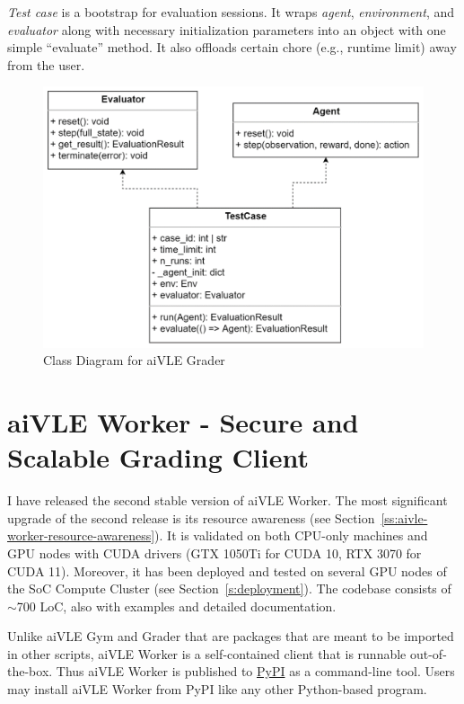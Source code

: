 \textit{Test case} is a bootstrap for evaluation sessions. It wraps \textit{agent}, \textit{environment}, and \textit{evaluator} along with necessary initialization parameters into an object with one simple “evaluate” method. It also offloads certain chore (e.g., runtime limit) away from the user.
\begin{figure}[H]
    \centering
    \includegraphics{images/aivle-grader-class.png}
    \caption{Class Diagram for aiVLE Grader}
    \label{fig:aivle-grader-class}
\end{figure}

\section{aiVLE Worker - Secure and Scalable Grading Client}
\label{ch:aivle-worker}
I have released the second stable version of aiVLE Worker. The most significant upgrade of the second release is its resource awareness (see Section~\ref{ss:aivle-worker-resource-awareness}). It is validated on both CPU-only machines and GPU nodes with CUDA drivers (GTX 1050Ti for CUDA 10, RTX 3070 for CUDA 11). Moreover, it has been deployed and tested on several GPU nodes of the SoC Compute Cluster (see Section~\ref{s:deployment}). The codebase consists of $\sim$700 LoC, also with examples and detailed documentation. 

Unlike aiVLE Gym and Grader that are packages that are meant to be imported in other scripts, aiVLE Worker is a self-contained client that is runnable out-of-the-box. Thus aiVLE Worker is published to \href{https://test.pypi.org/project/aivle-worker/}{PyPI} as a command-line tool. Users may install aiVLE Worker from PyPI like any other Python-based program.


